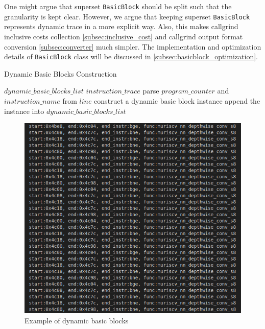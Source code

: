 One might argue that superset \texttt{BasicBlock} should be split such that the granularity is kept clear. However, we argue that keeping superset \texttt{BasicBlock} represents dynamic trace in a more explicit way. Also, this makes callgrind inclusive costs collection \ref{subsec:inclusive_cost} and callgrind output format conversion \ref{subsec:converter} much simpler. The implementation and optimization details of \texttt{BasicBlock} class will be discussed in \ref{subsec:basicblock_optimization}. 

\medskip
\begin{algorithm}
\caption{Dynamic Basic Blocks Construction}
\label{alg:dynamic_basic_blocks}
\begin{algorithmic}
\REQUIRE $dynamic\_basic\_blocks\_list$
\REQUIRE $instruction\_trace$
    \STATE parse $program\_counter$ and $instruction\_name$ from $line$ 
        \STATE construct a dynamic basic block instance
        \STATE append the instance into $dynamic\_basic\_blocks\_list$
    \ENDIF
\ENDFOR
\end{algorithmic}
\end{algorithm}
\medskip

\begin{figure}
    \centering
    \includegraphics[width=\linewidth]{figures/Basic_Block.png}
    \caption{Example of dynamic basic blocks}
    \label{fig:basic_block}
\end{figure}

